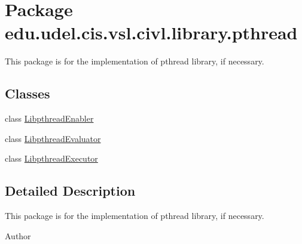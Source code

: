 \hypertarget{namespaceedu_1_1udel_1_1cis_1_1vsl_1_1civl_1_1library_1_1pthread}{}\section{Package edu.\+udel.\+cis.\+vsl.\+civl.\+library.\+pthread}
\label{namespaceedu_1_1udel_1_1cis_1_1vsl_1_1civl_1_1library_1_1pthread}


This package is for the implementation of pthread library, if necessary.  


\subsection*{Classes}
\begin{DoxyCompactItemize}
\item 
class \hyperlink{classedu_1_1udel_1_1cis_1_1vsl_1_1civl_1_1library_1_1pthread_1_1LibpthreadEnabler}{Libpthread\+Enabler}
\item 
class \hyperlink{classedu_1_1udel_1_1cis_1_1vsl_1_1civl_1_1library_1_1pthread_1_1LibpthreadEvaluator}{Libpthread\+Evaluator}
\item 
class \hyperlink{classedu_1_1udel_1_1cis_1_1vsl_1_1civl_1_1library_1_1pthread_1_1LibpthreadExecutor}{Libpthread\+Executor}
\end{DoxyCompactItemize}


\subsection{Detailed Description}
This package is for the implementation of pthread library, if necessary. 

\begin{DoxyAuthor}{Author}

\end{DoxyAuthor}
